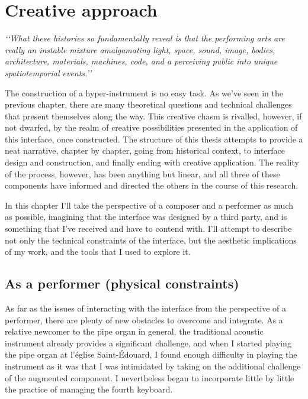 \documentclass[12pt,twoside,maitrise]{dms_ks}
\theoremstyle{definition}
\begin{document}
{{\chapter{Creative approach}

\epigraph{\textit{‘‘What these histories so fundamentally reveal is that the performing arts are really an instable mixture amalgamating light, space, sound, image, bodies, architecture, materials, machines, code, and a perceiving public into unique spatiotemporial events.’’}\footnotemark}{}

The construction of a hyper-instrument is no easy task.
As we've seen in the previous chapter, there are many theoretical questions and technical challenges that present themselves along the way.
This creative chasm is rivalled, however, if not dwarfed, by the realm of creative possibilities presented in the application of this interface, once constructed.
The structure of this thesis attempts to provide a neat narrative, chapter by chapter, going from historical context, to interface design and construction, and finally ending with creative application.
The reality of the process, however, has been anything but linear, and all three of these components have informed and directed the others in the course of this research.

In this chapter I’ll take the perspective of a composer and a performer as much as possible, imagining that the interface was designed by a third party, and is something that I’ve received and have to contend with.
I’ll attempt to describe not only the technical constraints of the interface, but the aesthetic implications of my work, and the tools that I used to explore it.

\section{As a performer (physical constraints)}

As far as the issues of interacting with the interface from the perspective of a performer, there are plenty of new obstacles to overcome and integrate. 
As a relative newcomer to the pipe organ in general, the traditional acoustic instrument already provides a significant challenge, and when I started playing the pipe organ at l’église Saint-Édouard, I found enough difficulty in playing the instrument as it was that I was intimidated by taking on the additional challenge of the augmented component. 
I nevertheless began to incorporate little by little the practice of managing the fourth keyboard. 

}}
\end{document}
